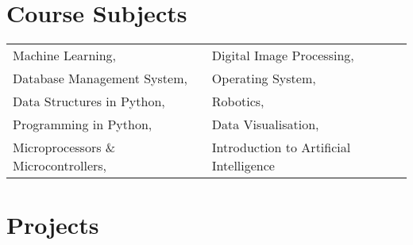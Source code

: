 \documentclass[letterpaper]{twentysecondcv} %
\begin{document}

\section{Course Subjects}
\newline
\begin{center}
\begin{tabular}{p{5.5cm}|p{5.5cm}}
\hline
\hline
    Machine Learning, & Digital Image Processing,  \\
      Database Management System, & Operating System,\\
      Data Structures in Python,& Robotics,\\
     Programming in Python, & Data Visualisation,\\
     Microprocessors \& Microcontrollers, &  Introduction to Artificial Intelligence\\
     \hline
     \hline
\end{tabular}
\end{center}
\newline


\section{Projects}
\end{document}
